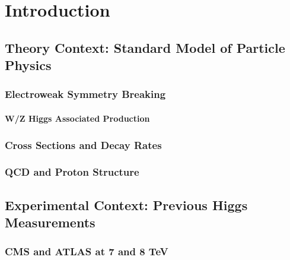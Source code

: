\chapter{Introduction}


\section{Theory Context: Standard Model of Particle Physics}

\subsection{Electroweak Symmetry Breaking}

\subsubsection{W/Z Higgs Associated Production}

\subsection{Cross Sections and Decay Rates}

\subsection{QCD and Proton Structure}

\section{Experimental Context: Previous Higgs Measurements}


\subsection{CMS and ATLAS at 7 and 8 TeV}





